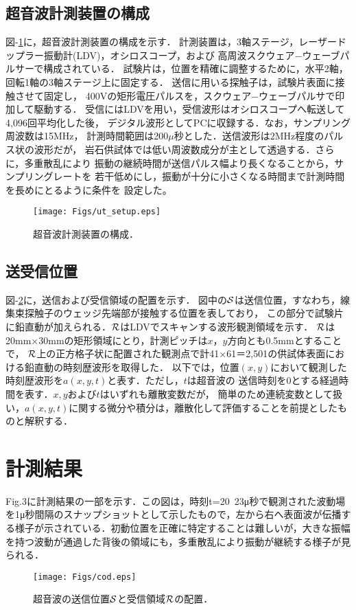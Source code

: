 \subsection{超音波計測装置の構成}
図-\ref{fig:fig3}に，超音波計測装置の構成を示す．
計測装置は，3軸ステージ，レーザードップラー振動計(LDV)，オシロスコープ，および
高周波スクウェア−ウェーブパルサーで構成されている．
試験片は，位置を精確に調整するために，水平2軸，回転1軸の3軸ステージ上に固定する．
送信に用いる探触子は，試験片表面に接触させて固定し，
400Vの矩形電圧パルスを，スクウェア−ウェーブパルサで印加して駆動する．
受信にはLDVを用い，受信波形はオシロスコープへ転送して4,096回平均化した後，
デジタル波形としてPCに収録する．なお，サンプリング周波数は15MHz，
計測時間範囲は200$\mu$秒とした．送信波形は2MHz程度のパルス状の波形だが，
岩石供試体では低い周波数成分が主として透過する．さらに，多重散乱により
振動の継続時間が送信パルス幅より長くなることから，サンプリングレートを
若干低めにし，振動が十分に小さくなる時間まで計測時間を長めにとるように条件を
設定した。
\begin{figure}[t]
\begin{center}
\texttt{[image: Figs/ut\_setup.eps]}
\caption{
	超音波計測装置の構成．
}
\label{fig:fig3}
\end{center}
\end{figure}
\subsection{送受信位置}
図-\ref{fig:fig4}に，送信および受信領域の配置を示す．
図中の${\cal S}$は送信位置，すなわち，線集束探触子のウェッジ先端部が接触する位置を表しており，
この部分で試験片に鉛直動が加えられる．${\cal R}$はLDVでスキャンする波形観測領域を示す．
$\cal R$は20mm$\times$30mmの矩形領域にとり，計測ピッチは$x$，$y$方向とも0.5mmとすることで，
$\cal R$上の正方格子状に配置された観測点で計41×61＝2,501の供試体表面における鉛直動の時刻歴波形を取得した．
以下では，位置$(x,y)$において観測した時刻歴波形を$a(x,y,t)$と表す．ただし，$t$は超音波の
送信時刻を0とする経過時間を表す．$x,y$および$t$はいずれも離散変数だが，
簡単のため連続変数として扱い，$a(x,y,t)$に関する微分や積分は，離散化して評価することを前提としたものと解釈する．
\section{計測結果}
Fig.3に計測結果の一部を示す．この図は，時刻t=20~23μ秒で観測された波動場を1μ秒間隔のスナップショットとして示したもので，左から右へ表面波が伝播する様子が示されている．初動位置を正確に特定することは難しいが，大きな振幅を持つ波動が通過した背後の領域にも，多重散乱により振動が継続する様子が見られる．
\begin{figure}[t]
\begin{center}
\texttt{[image: Figs/cod.eps]}
\caption{
	超音波の送信位置$\cal S$と受信領域$\cal R$の配置．
}
\label{fig:fig4}
\end{center}
\end{figure}

